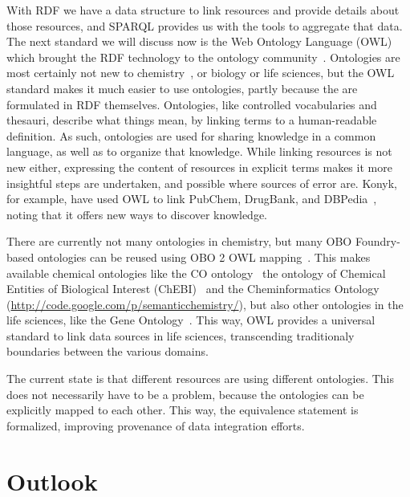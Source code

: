 \documentclass[10pt]{bmc_article}
\newenvironment{bmcformat}{\begin{raggedright}\baselineskip20pt\sloppy\setboolean{publ}{false}}{\end{raggedright}\baselineskip20pt\sloppy}
\begin{document}
\begin{bmcformat}
With RDF we have a data structure to link resources and provide details about
those resources, and SPARQL provides us with the tools to aggregate that data.
The next standard we will discuss now is the Web Ontology
Language (OWL) which brought the RDF technology to the ontology community~\cite{GUN2004}.
Ontologies are most certainly not new to chemistry~\cite{Gordon1988}, or biology or life sciences,
but the OWL standard makes it much easier to use ontologies, partly because
the are formulated in RDF themselves. Ontologies, like
controlled vocabularies and thesauri, describe what things mean, by linking
terms to a human-readable definition. As such, ontologies are used for sharing
knowledge in a common language, as well as to organize that knowledge.
While linking resources is not new either, expressing the content of resources
in explicit terms makes it more insightful steps are undertaken, and possible
where sources of error are. Konyk, for example, have used OWL to link PubChem,
DrugBank, and DBPedia~\cite{Konyk2008}, noting that it offers new ways to
discover knowledge.

There are currently not many ontologies in chemistry, but many OBO Foundry-based
ontologies can be reused using OBO 2 OWL mapping~\cite{Moreira2007}. This makes
available chemical ontologies like the CO ontology~\cite{Feldman2005}
the ontology of Chemical Entities of Biological Interest (ChEBI)~\cite{Degtyarenko2008,Hull2008}
and the Cheminformatics Ontology (\url{http://code.google.com/p/semanticchemistry/}),
but also other ontologies in the life sciences, like the Gene Ontology~\cite{Aranguren2007}.
This way, OWL provides a universal standard to link data sources in life
sciences, transcending traditionaly boundaries between the various domains.

The current state is that different resources are using different ontologies.
This does not necessarily have to be a problem, because the ontologies can be
explicitly mapped to each other. This way, the equivalence statement is formalized,
improving provenance of data integration efforts.

\section{Outlook}


\end{bmcformat}
\end{document}
